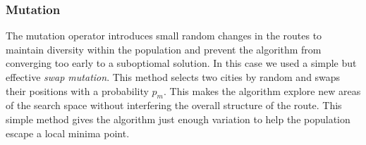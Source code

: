 \documentclass{scrartcl}
\begin{document}
% 

% 
% 



\subsubsection{Mutation}
The mutation operator introduces small random changes in the routes to maintain diversity within the population and prevent the algorithm from converging too early to a suboptiomal solution. In this case we used a simple but effective \textit{swap mutation}. This method selects two cities by random and swaps their positions with a probability $p_m$. This makes the algorithm explore new areas of the search space without interfering the overall structure of the route. This simple method gives the algorithm just enough variation to help the population escape a local minima point.
\end{document}
